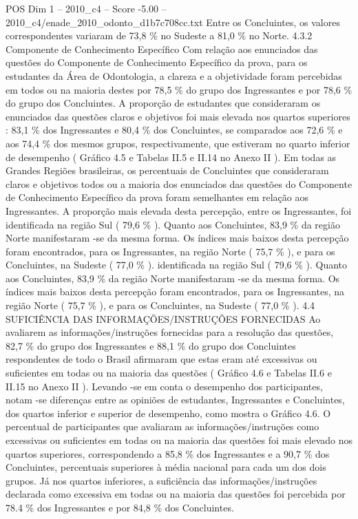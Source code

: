 \begin{textsample}{POS Dim 1 – 2010\_c4 – Score -5.00 – 2010\_c4/enade\_2010\_odonto\_d1b7c708cc.txt}
Entre os Concluintes, os valores correspondentes variaram de 73,8 \% no Sudeste a 81,0 \% no Norte. 4.3.2 Componente de Conhecimento Específico Com relação aos enunciados das questões do Componente de Conhecimento Específico da prova, para os estudantes da Área de Odontologia, a clareza e a objetividade foram percebidas em todos ou na maioria destes por 78,5 \% do grupo dos Ingressantes e por 78,6 \% do grupo dos Concluintes.
A proporção de estudantes que consideraram os enunciados das questões claros e objetivos foi mais elevada nos quartos superiores : 83,1 \% dos Ingressantes e 80,4 \% dos Concluintes, se comparados aos 72,6 \% e aos 74,4 \% dos mesmos grupos, respectivamente, que estiveram no quarto inferior de desempenho ( Gráfico 4.5 e Tabelas II.5 e II.14 no Anexo II ).
Em todas as Grandes Regiões brasileiras, os percentuais de Concluintes que consideraram claros e objetivos todos ou a maioria dos enunciados das questões do Componente de Conhecimento Específico da prova foram semelhantes em relação aos Ingressantes.
A proporção mais elevada desta percepção, entre os Ingressantes, foi identificada na região Sul ( 79,6 \% ).
Quanto aos Concluintes, 83,9 \% da região Norte manifestaram -se da mesma forma.
Os índices mais baixos desta percepção foram encontrados, para os Ingressantes, na região Norte ( 75,7 \% ), e para os Concluintes, na Sudeste ( 77,0 \% ). identificada na região Sul ( 79,6 \% ).
Quanto aos Concluintes, 83,9 \% da região Norte manifestaram -se da mesma forma.
Os índices mais baixos desta percepção foram encontrados, para os Ingressantes, na região Norte ( 75,7 \% ), e para os Concluintes, na Sudeste ( 77,0 \% ). 4.4 SUFICIÊNCIA DAS INFORMAÇÕES/INSTRUÇÕES FORNECIDAS Ao avaliarem as informações/instruções fornecidas para a resolução das questões, 82,7 \% do grupo dos Ingressantes e 88,1 \% do grupo dos Concluintes respondentes de todo o Brasil afirmaram que estas eram até excessivas ou suficientes em todas ou na maioria das questões ( Gráfico 4.6 e Tabelas II.6 e II.15 no Anexo II ).
Levando -se em conta o desempenho dos participantes, notam -se diferenças entre as opiniões de estudantes, Ingressantes e Concluintes, dos quartos inferior e superior de desempenho, como mostra o Gráfico 4.6.
O percentual de participantes que avaliaram as informações/instruções como excessivas ou suficientes em todas ou na maioria das questões foi mais elevado nos quartos superiores, correspondendo a 85,8 \% dos Ingressantes e a 90,7 \% dos Concluintes, percentuais superiores à média nacional para cada um dos dois grupos.
Já nos quartos inferiores, a suficiência das informações/instruções declarada como excessiva em todas ou na maioria das questões foi percebida por 78.4 \% dos Ingressantes e por 84,8 \% dos Concluintes.

\end{textsample}
